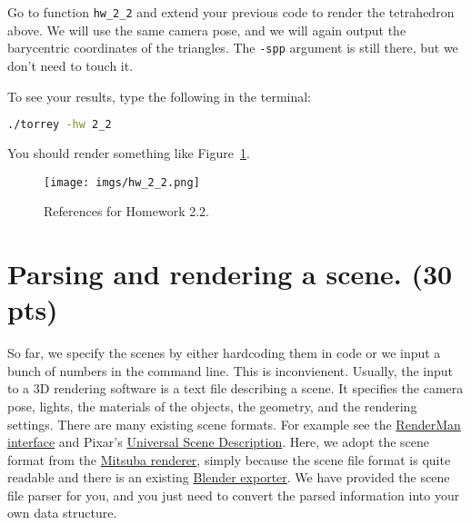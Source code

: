 Go to function \lstinline{hw_2_2} and extend your previous code to render the tetrahedron above. We will use the same camera pose, and we will again output the barycentric coordinates of the triangles. The \lstinline{-spp} argument is still there, but we don't need to touch it.

To see your results, type the following in the terminal:
\begin{lstlisting}[language=bash]
  ./torrey -hw 2_2
\end{lstlisting}

You should render something like Figure~\ref{fig:hw_2_2}.

\begin{figure}[ht]
    \centering
    \texttt{[image: imgs/hw\_2\_2.png]}
    \caption{References for Homework 2.2.}
    \label{fig:hw_2_2}
\end{figure}

\section{Parsing and rendering a scene. (30 pts)}
So far, we specify the scenes by either hardcoding them in code or we input a bunch of numbers in the command line. 
This is inconvienent. Usually, the input to a 3D rendering software is a text file describing a scene. It specifies the camera pose, lights, the materials of the objects, the geometry, and the rendering settings. There are many existing scene formats. For example see the \href{https://en.wikipedia.org/wiki/RenderMan_Interface_Specification}{RenderMan interface} and Pixar's \href{https://en.wikipedia.org/wiki/Universal_Scene_Description}{Universal Scene Description}. Here, we adopt the scene format from the \href{https://mitsuba.readthedocs.io/}{Mitsuba renderer}, simply because the scene file format is quite readable and there is an existing \href{https://github.com/mitsuba-renderer/mitsuba-blender}{Blender exporter}. We have provided the scene file parser for you, and you just need to convert the parsed information into your own data structure.


